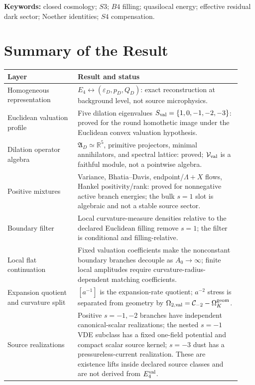 \documentclass[11pt,a4paper]{article}
\def\Bfour{B4}%
\def\Sthree{S3}%
\def\Sfour{S4}%
\def\Dil{D}%
\numberwithin{equation}{section}
\theoremstyle{definition}
\theoremstyle{plain}
\theoremstyle{remark}
\newcommand{\Sthree}{S^3}
\newcommand{\Sfour}{S^4}
\newcommand{\Bfour}{B^4}
\newcommand{\Dil}{\mathscr{D}}
\newcommand{\Efour}{E_4}
\newcommand{\epsD}{\varepsilon_D}
\newcommand{\pD}{p_D}
\newcommand{\QD}{Q_D}
\begin{document}
\noindent\textbf{Keywords:} closed cosmology; \(\Sthree\); \(\Bfour\) filling; quasilocal energy; effective residual dark sector; Noether identities; \(\Sfour\) compensation.

\section*{Summary of the Result}
\begin{center}
\begin{tabular}{@{}p{0.28\linewidth}p{0.65\linewidth}@{}}
\toprule
Layer & Result and status \\
\midrule
Homogeneous representation & \(\Efour\leftrightarrow(\epsD,\pD,\QD)\): exact reconstruction at background level, not source microphysics. \\
Euclidean valuation profile & Five dilation eigenvalues \(S_{\rm val}=\{1,0,-1,-2,-3\}\): proved for the round homothetic image under the Euclidean convex valuation hypothesis. \\
Dilation operator algebra & \(\mathfrak A_{\Dil}\simeq\mathbb R^5\), primitive projectors, minimal annihilators, and spectral lattice: proved; \(\mathcal V_{\rm val}\) is a faithful module, not a pointwise algebra. \\
Positive mixtures & Variance, Bhatia--Davis, endpoint/\(\Lambda+X\) flows, Hankel positivity/rank: proved for nonnegative active branch energies; the bulk \(s=1\) slot is algebraic and not a stable source sector. \\
Boundary filter & Local curvature-measure densities relative to the declared Euclidean filling remove \(s=1\); the filter is conditional and filling-relative. \\
Local flat continuation & Fixed valuation coefficients make the nonconstant boundary branches decouple as \(A_0\to\infty\); finite local amplitudes require curvature-radius-dependent matching coefficients. \\
Expansion quotient and curvature split & \([a^{-1}]\) is the expansion-rate quotient; \(a^{-2}\) stress is separated from geometry by \(\Omega_{2,\rm val}=\mathcal C_{-2}-\Omega_K^{\rm geom}\). \\
Source realizations & Positive \(s=-1,-2\) branches have independent canonical-scalar realizations; the nested \(s=-1\) VDE subclass has a fixed one-field potential and compact scalar source kernel; \(s=-3\) dust has a pressureless-current realization. These are existence lifts inside declared source classes and are not derived from \(\Efour^{\rm val}\). \\

\end{tabular}
\end{center}
\end{document}
